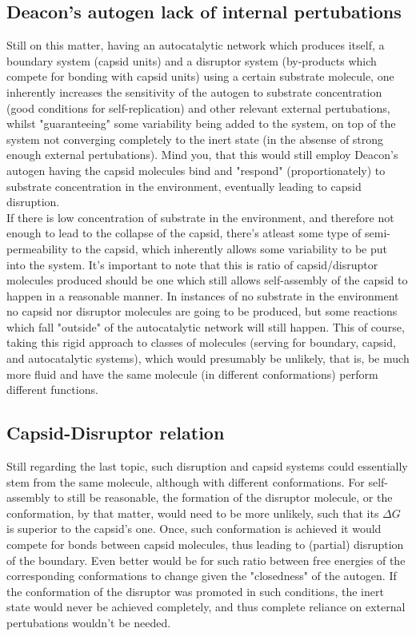 \documentclass[a4paper,12pt,twoside,leqno]{article}
\begin{document}
\subsection*{Deacon's autogen lack of internal pertubations}
Still on this matter, having an autocatalytic network which produces itself, a boundary system (capsid units) and a disruptor system (by-products which compete for bonding with capsid units) using a certain substrate molecule, one inherently increases the sensitivity of the autogen to substrate concentration (good conditions for self-replication) and other relevant external pertubations, whilst "guaranteeing" some variability being added to the system, on top of the system not converging completely to the inert state (in the absense of strong enough external pertubations). Mind you, that this would still employ Deacon's autogen having the capsid molecules bind and "respond" (proportionately) to substrate concentration in the environment, eventually leading to capsid disruption.\\
If there is low concentration of substrate in the environment, and therefore not enough to lead to the collapse of the capsid, there's atleast some type of semi-permeability to the capsid, which inherently allows some variability to be put into the system. It's important to note that this is ratio of capsid/disruptor molecules produced should be one which still allows self-assembly of the capsid to happen in a reasonable manner. In instances of no substrate in the environment no capsid nor disruptor molecules are going to be produced, but some reactions which fall "outside" of the autocatalytic network will still happen. This of course, taking this rigid approach to classes of molecules (serving for boundary, capsid, and autocatalytic systems), which would presumably be unlikely, that is, be much more fluid and have the same molecule (in different conformations) perform different functions.
\subsection*{Capsid-Disruptor relation}
Still regarding the last topic, such disruption and capsid systems could essentially stem from the same molecule, although with different conformations. For self-assembly to still be reasonable, the formation of the disruptor molecule, or the conformation, by that matter, would need to be more unlikely, such that its $\Delta G$ is superior to the capsid's one. Once, such conformation is achieved it would compete for bonds between capsid molecules, thus leading to (partial) disruption of the boundary. Even better would be for such ratio between free energies of the corresponding conformations to change given the "closedness" of the autogen. If the conformation of the disruptor was promoted in such conditions, the inert state would never be achieved completely, and thus complete reliance on external pertubations wouldn't be needed. 
\end{document}
